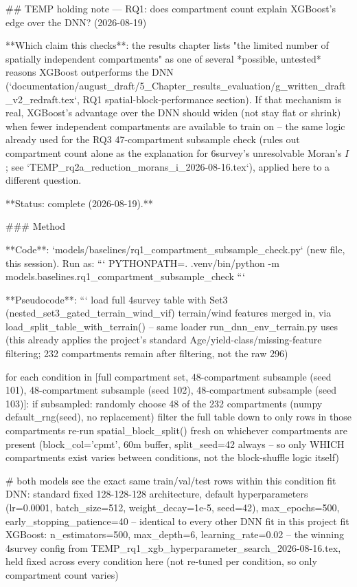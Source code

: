 ## TEMP holding note — RQ1: does compartment count explain XGBoost's edge over the DNN? (2026-08-19)

**Which claim this checks**: the results chapter lists "the limited number of spatially
independent compartments" as one of several *possible, untested* reasons XGBoost outperforms the
DNN (`documentation/august_draft/5_Chapter_results_evaluation/g_written_draft_v2_redraft.tex`,
RQ1 spatial-block-performance section). If that mechanism is real, XGBoost's advantage over the
DNN should widen (not stay flat or shrink) when fewer independent compartments are available to
train on -- the same logic already used for the RQ3 47-compartment subsample check (rules out
compartment count alone as the explanation for 6survey's unresolvable Moran's $I$; see
`TEMP_rq2a_reduction_morans_i_2026-08-16.tex`), applied here to a different question.

**Status: complete (2026-08-19).**

### Method

**Code**: `models/baselines/rq1_compartment_subsample_check.py` (new file, this session). Run as:
```
PYTHONPATH=. .venv/bin/python -m models.baselines.rq1_compartment_subsample_check
```

**Pseudocode**:
```
load full 4survey table with Set3 (nested_set3_gated_terrain_wind_vif) terrain/wind features
merged in, via load_split_table_with_terrain() -- same loader run_dnn_env_terrain.py uses
  (this already applies the project's standard Age/yield-class/missing-feature filtering;
  232 compartments remain after filtering, not the raw 296)

for each condition in [full compartment set,
                       48-compartment subsample (seed 101),
                       48-compartment subsample (seed 102),
                       48-compartment subsample (seed 103)]:
    if subsampled:
        randomly choose 48 of the 232 compartments (numpy default_rng(seed), no replacement)
        filter the full table down to only rows in those compartments
    re-run spatial_block_split() fresh on whichever compartments are present (block_col='cpmt',
        60m buffer, split_seed=42 always -- so only WHICH compartments exist varies between
        conditions, not the block-shuffle logic itself)

    # both models see the exact same train/val/test rows within this condition
    fit DNN: standard fixed 128-128-128 architecture, default hyperparameters
        (lr=0.0001, batch_size=512, weight_decay=1e-5, seed=42), max_epochs=500,
        early_stopping_patience=40 -- identical to every other DNN fit in this project
    fit XGBoost: n_estimators=500, max_depth=6, learning_rate=0.02 -- the winning 4survey
        config from TEMP_rq1_xgb_hyperparameter_search_2026-08-16.tex, held fixed across every
        condition here (not re-tuned per condition, so only compartment count varies)

